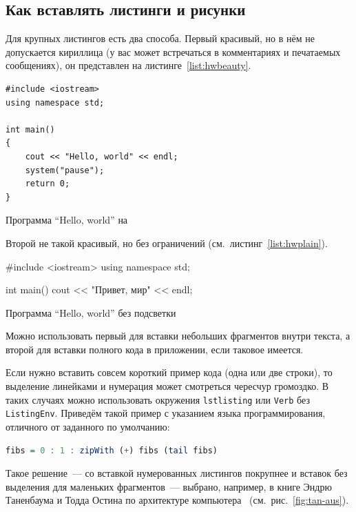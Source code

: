 \subsection{Как вставлять листинги и рисунки}

Для крупных листингов есть два способа. Первый красивый, но в нём не допускается
кириллица (у вас может встречаться в комментариях и
печатаемых сообщениях), он представлен на листинге~\ref{list:hwbeauty}.
\begin{ListingEnv}[H]%
\begin{lstlisting}
#include <iostream>
using namespace std;

int main()
{
    cout << "Hello, world" << endl;
    system("pause");
    return 0;
}
\end{lstlisting}
\caption{Программа “Hello, world” на \protect\cpp}
\label{list:hwbeauty}
\end{ListingEnv}

Второй не такой красивый, но без ограничений (см.~листинг~\ref{list:hwplain}).
\begin{ListingEnv}[H]
\begin{Verb}

#include <iostream>
using namespace std;

int main()
{
    cout << "Привет, мир" << endl;
}
\end{Verb}
\caption{Программа “Hello, world” без подсветки}
\label{list:hwplain}
\end{ListingEnv}

Можно использовать первый для вставки небольших фрагментов
внутри текста, а второй для вставки полного
кода в приложении, если таковое имеется.

Если нужно вставить совсем короткий пример кода (одна или две строки), то выделение  линейками и нумерация может смотреться чересчур громоздко. В таких случаях можно использовать окружения \texttt{lstlisting} или \texttt{Verb} без \texttt{ListingEnv}. Приведём такой пример с указанием языка программирования, отличного от заданного по умолчанию:
\begin{lstlisting}[language=Haskell]
fibs = 0 : 1 : zipWith (+) fibs (tail fibs)
\end{lstlisting}
Такое решение~--- со вставкой нумерованных листингов покрупнее
и вставок без выделения для маленьких фрагментов~--- выбрано,
например, в книге Эндрю Таненбаума и Тодда Остина по архитектуре
компьютера~\autocite{TanAus2013} (см.~рис.~\ref{fig:tan-aus}).

